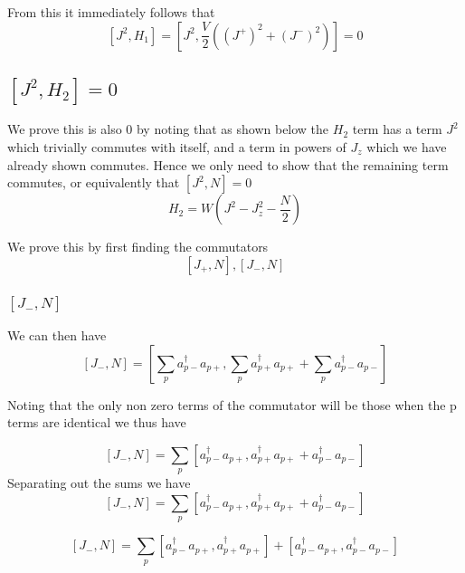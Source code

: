 \documentclass[11pt]{article} %
\begin{document}
From this it immediately follows that 
\begin{equation}
\left[J^2,H_1\right]=\left[J^2, \frac{V}{2}\left((J^+)^2+(J^-)^2\right)\right]=0
\end{equation}

\subsection{$\left[J^2,H_2\right]=0$}

We prove this is also 0 by noting that as shown below the $H_2$ term has a term $J^2$ which trivially commutes with itself, and a term in powers of $J_z$ which we have already shown commutes. Hence we only need to show that the remaining term commutes, or equivalently that $\left[J^2,N\right]=0$\\
\begin{equation}
H_2=W\left(J^2-J_z^2-\frac{N}{2}\right)
\end{equation}

We prove this by first finding the commutators\\

\begin{equation}
\left[J_+,N\right], \left[J_-,N\right]
\end{equation}
\subsubsection{$\left[J_-,N\right]$}
We can then have\\

\begin{equation}
\left[J_-,N\right]=\left[\sum_p a_{p-}^\dagger a_{p+}, \sum_p a_{p+}^\dagger a_{p+} +\sum_p a_{p-}^\dagger a_{p-}\right]
\end{equation}

Noting that the only non zero terms of the commutator will be those when the p terms are identical we thus have

\begin{equation}
\left[J_-,N\right]=\sum_p\left[ a_{p-}^\dagger a_{p+},  a_{p+}^\dagger a_{p+} + a_{p-}^\dagger a_{p-}\right]
\end{equation}
Separating out the sums we have
\begin{equation}
\left[J_-,N\right]=\sum_p\left[ a_{p-}^\dagger a_{p+},  a_{p+}^\dagger a_{p+} + a_{p-}^\dagger a_{p-}\right]
\end{equation}

\begin{equation}
\left[J_-,N\right]=\sum_p\left[ a_{p-}^\dagger a_{p+},  a_{p+}^\dagger a_{p+} \right]+\left[ a_{p-}^\dagger a_{p+},  a_{p-}^\dagger a_{p-}\right]
\end{equation}
\end{document}
